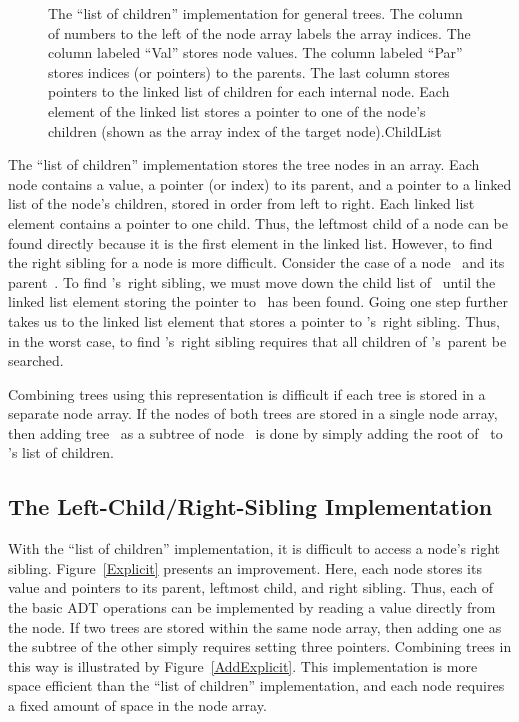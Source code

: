 \begin{figure}
\smallskip
{}
{The ``list of children'' implementation for general trees.
The column of numbers to the left of the node array labels the array
indices.
The column labeled ``Val'' stores node values.
The column labeled ``Par'' stores indices (or pointers) to the
parents.
The last column stores pointers to the linked list of children for
each internal node.
Each element of the linked list stores a pointer to
one of the node's children (shown as the array index of the target
node).}{ChildList}
\bigskip
\end{figure}

The ``list of children'' implementation stores the tree nodes in an
array.
Each node contains a value, a pointer (or index) to its parent, and a
pointer to a linked list of the node's children, stored in order from
left to right.
Each linked list element contains a pointer to one child.
Thus, the leftmost child of a node can be found directly because it is
the first element in the linked list.
However, to find the right sibling for a node is more difficult.
Consider the case of a node~ and its parent~.
To find 's~right sibling, we must move down the child list
of~ until the linked list element storing the pointer
to~ has been found.
Going one step further takes us to the linked list element that stores
a pointer to 's~right sibling.
Thus, in the worst case, to find 's~right sibling requires
that all children of 's~parent be searched.

Combining trees using this representation is difficult if each tree
is stored in a separate node array.
If the nodes of both trees are stored in a single node array, then
adding tree~ as a subtree of node~ is done by
simply adding the root of~ to 's list of children.

\subsection{The Left-Child/Right-Sibling Implementation}
\label{LeftRight}

With the ``list of children'' implementation, it is difficult to
access a node's right sibling.
Figure~\ref{Explicit} presents an improvement.
Here, each node stores its value and pointers to its parent, leftmost
child, and right sibling.
Thus, each of the basic ADT operations can be implemented by reading a
value directly from the node.
If two trees are stored within the same node array, then adding one
as the subtree of the other simply requires setting three pointers.
Combining trees in this way is illustrated by
Figure~\ref{AddExplicit}.
This implementation is more space efficient than the
``list of children'' implementation, and each node requires a fixed
amount of space in the node
array.

